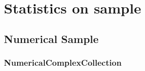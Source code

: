 \newpage\section{Statistics on sample}




\subsection{Numerical Sample}

\subsubsection{NumericalComplexCollection}

